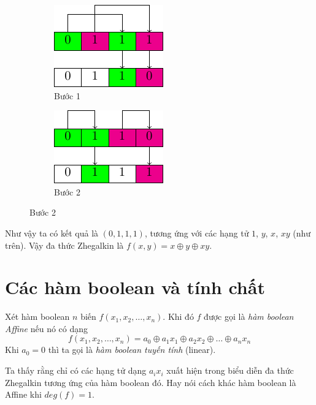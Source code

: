 \begin{figure}[ht]
    \begin{subfigure}{0.45\textwidth}
        \centering
        \includegraphics{../pics/boolean/zhegalkin3.pdf}
        \caption{Bước 1}
    \end{subfigure}
    \hfill
    \begin{subfigure}{0.45\textwidth}
        \centering
        \includegraphics{../pics/boolean/zhegalkin4.pdf}
        \caption{Bước 2}
    \end{subfigure}
\end{figure}

Như vậy ta có kết quả là $(0, 1, 1, 1)$, tương ứng với các
hạng tử $1$, $y$, $x$, $xy$ (như trên). Vậy đa thức Zhegalkin
là $f(x, y) = x \oplus y \oplus xy$.

\section{Các hàm boolean và tính chất}

\begin{definition}
    Xét hàm boolean $n$ biến $f(x_1, x_2, \ldots, x_n)$.
    Khi đó $f$ được gọi là
    \textit{hàm boolean Affine} nếu nó có dạng
    \begin{equation}
        f(x_1, x_2, \ldots, x_n) = a_0 \oplus a_1 x_1 \oplus 
        a_2 x_2 \oplus \ldots \oplus a_n x_n
    \end{equation}
    Khi $a_0 = 0$ thì ta gọi là \textit{hàm boolean tuyến tính}
    (linear).
\end{definition}

Ta thấy rằng chỉ có các hạng tử dạng $a_i x_i$ xuất hiện trong
biểu diễn đa thức Zhegalkin tương ứng của hàm boolean đó. Hay 
nói cách khác hàm boolean là Affine khi $deg(f) = 1$.


